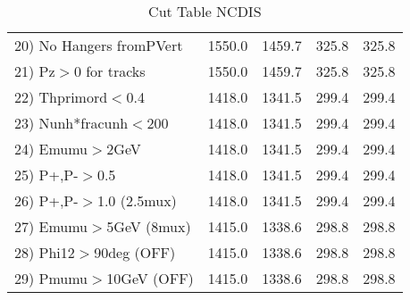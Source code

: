 \begin{table}[h!]
\begin{tabular}{||l||r|r|r|r||}
 20) No Hangers fromPVert &      1550.0 &      1459.7 &       325.8 &       325.8 \\
 21) Pz$>$0 for tracks    &      1550.0 &      1459.7 &       325.8 &       325.8 \\
 22) Thprimord$<$0.4      &      1418.0 &      1341.5 &       299.4 &       299.4 \\
 23) Nunh*fracunh$<$200   &      1418.0 &      1341.5 &       299.4 &       299.4 \\
 24) Emumu$>$2GeV         &      1418.0 &      1341.5 &       299.4 &       299.4 \\
 25) P+,P-$>$0.5          &      1418.0 &      1341.5 &       299.4 &       299.4 \\
 26) P+,P-$>$1.0 (2.5mux) &      1418.0 &      1341.5 &       299.4 &       299.4 \\
 27) Emumu$>$5GeV  (8mux) &      1415.0 &      1338.6 &       298.8 &       298.8 \\
 28) Phi12$>$90deg  (OFF) &      1415.0 &      1338.6 &       298.8 &       298.8 \\
 29) Pmumu$>$10GeV  (OFF) &      1415.0 &      1338.6 &       298.8 &       298.8 \\
 \hline
 \hline
 \end{tabular}
 \caption{Cut Table  NCDIS  }
 \label{tab-cut_ncdis}
 \end{table}

